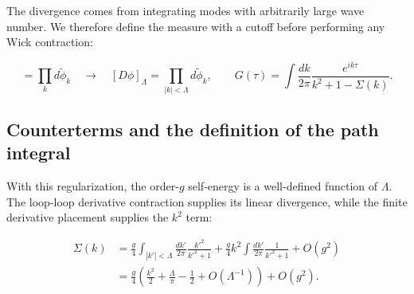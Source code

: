 The divergence comes from integrating modes with arbitrarily large wave
number. We therefore define the measure with a cutoff before performing any
Wick contraction:

\begin{equation}
 [D\phi]=\prod_k d\widetilde\phi_k
 \quad\longrightarrow\quad
 [D\phi]_\Lambda=\prod_{|k|<\Lambda}d\widetilde\phi_k,
 \qquad
 G(\tau)=\int\frac{dk}{2\pi}
 \frac{e^{ik\tau}}{k^2+1-\Sigma(k)}.
 \label{eq:253a-cutoff-measure}
\end{equation}

\subsection{Counterterms and the definition of the path integral}
\label{sec:253a-counterterms}

With this regularization, the order-$g$ self-energy is a well-defined function
of $\Lambda$. The loop-loop derivative contraction supplies its linear
divergence, while the finite derivative placement supplies the $k^2$ term:

\begin{equation}
 \begin{aligned}
 \Sigma(k)&=\frac{g}{4}\int_{|k'|<\Lambda}\frac{dk'}{2\pi}
 \frac{k'^2}{k'^2+1}
 +\frac{g}{4}k^2\int\frac{dk'}{2\pi}\frac{1}{k'^2+1}+O(g^2)\\
 &=\frac{g}{4}\left(\frac{k^2}{2}+\frac{\Lambda}{\pi}
 -\frac{1}{2}+O(\Lambda^{-1})\right)+O(g^2).
 \end{aligned}
 \label{eq:253a-cutoff-self-energy}
\end{equation}

